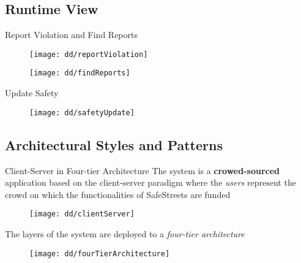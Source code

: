 	\subsection{Runtime View}
		\begin{frame}{Report Violation and Find Reports}
			\vspace{-5pt}
			\begin{figure}
				\centering
				\texttt{[image: dd/reportViolation]}
			\end{figure}
			\vspace{-10pt}
			\begin{figure}
				\centering
				\texttt{[image: dd/findReports]}
			\end{figure}
		\end{frame}
	
		\begin{frame}{Update Safety}
			\begin{figure}[hbtp]
				\centering
				\texttt{[image: dd/safetyUpdate]}
			\end{figure}
		\end{frame}
	
	\subsection{Architectural Styles and Patterns}
		\begin{frame}{Client-Server in Four-tier Architecture}
			The system is a \textbf{crowed-sourced} application based on the client-server paradigm where the \emph{users} represent the crowd on which the functionalities of SafeStreets are funded
			
			\begin{figure}[h!]
				\centering
				\texttt{[image: dd/clientServer]}
			\end{figure}
		
			The layers of the system are deployed to a \emph{four-tier architecture}
			
			\begin{figure}[h]
				\centering
				\texttt{[image: dd/fourTierArchitecture]}
			\end{figure}
		\end{frame}
	
